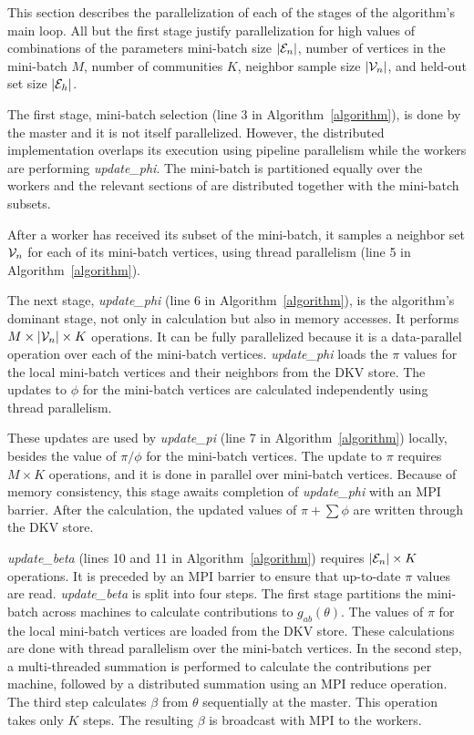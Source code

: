 This section describes the parallelization of each of the stages of the
algorithm's main loop. All but the first stage justify parallelization for
high values of combinations of the parameters mini-batch size $|\Minibatch|$,
number of vertices in the mini-batch $M$,
number of communities $K$, neighbor sample size $|\Neighbors|$, and held-out set
size $|\cE_h|$.

The first stage, mini-batch selection (line 3 in Algorithm~\ref{algorithm}),
is done by the master and it is
not itself parallelized. However, the distributed implementation overlaps
its execution using pipeline parallelism while the workers are
performing \textit{update\_phi}. The mini-batch is partitioned equally over
the workers and the relevant sections of \Edges are distributed together with the
mini-batch subsets.

After a worker has received its subset of the mini-batch, it samples a neighbor
set $\Neighbors$ for each of its mini-batch vertices, using thread parallelism
(line 5 in Algorithm~\ref{algorithm}).

The next stage, \textit{update\_phi} (line 6 in Algorithm~\ref{algorithm}), is the algorithm's dominant stage, not
only in calculation but also in memory accesses. It performs $M \times
|\Neighbors| \times
K$ operations. It can be fully parallelized because it is a data-parallel
operation over each of the mini-batch vertices. \textit{update\_phi} loads the
$\pi$ values for the local mini-batch vertices and their neighbors from the
DKV store. The updates to $\phi$ for the mini-batch vertices are calculated
independently using thread parallelism.

These updates are used by \textit{update\_pi} (line 7 in
Algorithm~\ref{algorithm}) locally, besides the value of
$\pi/\phi$ for the mini-batch vertices. The update to $\pi$ requires
$M \times K$ operations, and it is done in parallel over mini-batch vertices. Because of
memory consistency, this stage awaits completion of \textit{update\_phi} with
an MPI barrier. After the calculation, the updated values of $\pi+\sum\phi$
are written through the DKV store.

\textit{update\_beta} (lines 10 and 11 in Algorithm~\ref{algorithm}) requires $|\Minibatch| \times K$ operations. It is preceded by an MPI
barrier to ensure that up-to-date $\pi$ values are read. \textit{update\_beta}
is split into four steps. The first stage partitions the mini-batch across
machines to calculate contributions to $g_{ab}(\theta)$. The values of $\pi$ for
the local mini-batch vertices are loaded from the DKV store. These calculations
are done with thread parallelism over the mini-batch vertices. In the second step,
a multi-threaded summation is performed to calculate the contributions per
machine, followed by a distributed summation using an MPI reduce operation. The
third step calculates $\beta$ from $\theta$ sequentially at the master. This
operation takes only $K$ steps. The resulting $\beta$ is broadcast with MPI
to the workers.


